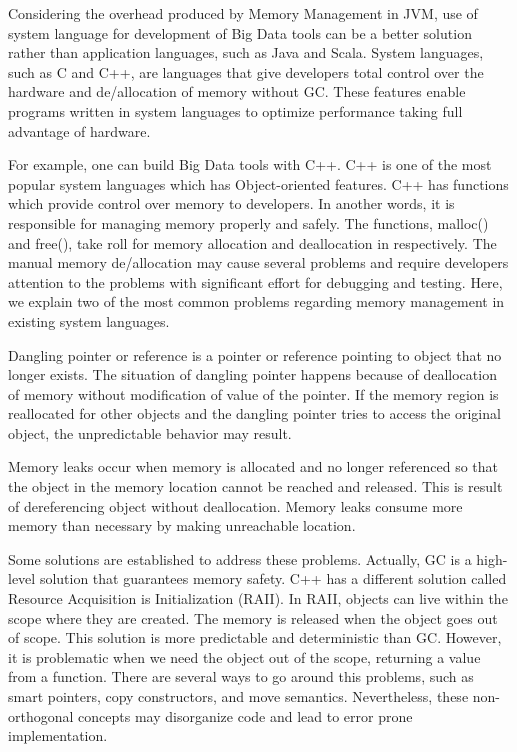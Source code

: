 
Considering the overhead produced by Memory Management in JVM, use of system language for development of Big Data tools can be a better solution rather than application languages, such as Java and Scala. 
System languages, such as C and C++, are languages that give developers total control over the hardware and de/allocation of memory without GC. 
These features enable programs written in system languages to optimize performance taking full advantage of hardware. 

For example, one can build Big Data tools with C++. C++ is one of the most popular system languages which has Object-oriented features. 
C++ has functions which provide control over memory to developers. In another words, it is responsible for managing memory properly and safely. 
The functions, malloc() and free(), take roll for memory allocation and deallocation in respectively. The manual memory de/allocation may cause several problems and require developers 
attention to the problems with significant effort for debugging and testing. Here, we explain two of the most common problems regarding memory management in existing system languages.

Dangling pointer or reference is a pointer or reference pointing to object that no longer exists. The situation of dangling pointer happens 
because of deallocation of memory without modification of value of the pointer. 
If the memory region is reallocated for other objects and the dangling pointer tries to access the original object, the unpredictable behavior may result. 

Memory leaks occur when memory is allocated and no longer referenced so that the object in the memory location cannot be reached and released.
This is result of dereferencing object without deallocation. Memory leaks consume more memory than necessary by making unreachable location.

Some solutions are established to address these problems. Actually, GC is a high-level solution that guarantees memory safety. 
C++ has a different solution called Resource Acquisition is Initialization (RAII). In RAII, objects can live within the scope where they are created. 
The memory is released when the object goes out of scope. This solution is more predictable and deterministic than GC. 
However, it is problematic when we need the object out of the scope, returning a value from a function. 
There are several ways to go around this problems, such as smart pointers, copy constructors, and move semantics. 
Nevertheless, these non-orthogonal concepts may disorganize code and lead to error prone implementation. 